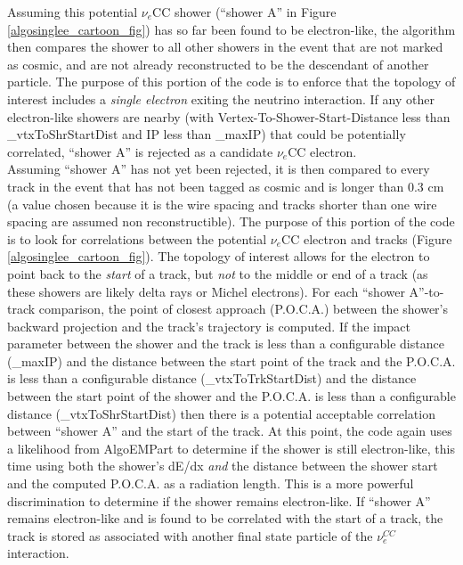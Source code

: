 Assuming this potential $\nu_e$CC shower (``shower A'' in Figure \ref{algosinglee_cartoon_fig}) has so far been found to be electron-like, the algorithm then compares the shower to all other showers in the event that are not marked as cosmic, and are not already reconstructed to be the descendant of another particle. The purpose of this portion of the code is to enforce that the topology of interest includes a \textit{single electron} exiting the neutrino interaction. If any other electron-like showers are nearby (with Vertex-To-Shower-Start-Distance less than \_vtxToShrStartDist and IP less than \_maxIP) that could be potentially correlated, ``shower A'' is rejected as a candidate $\nu_e$CC electron.\\

Assuming ``shower A'' has not yet been rejected, it is then compared to every track in the event that has not been tagged as cosmic and is longer than 0.3 cm (a value chosen because it is the wire spacing and tracks shorter than one wire spacing are assumed non reconstructible). The purpose of this portion of the code is to look for correlations between the potential $\nu_e$CC electron and tracks (Figure \ref{algosinglee_cartoon_fig}). The topology of interest allows for the electron to point back to the \textit{start} of a track, but \textit{not} to the middle or end of a track (as these showers are likely delta rays or Michel electrons). For each ``shower A''-to-track comparison, the point of closest approach (P.O.C.A.) between the shower's backward projection and the track's trajectory is computed. If the impact parameter between the shower and the track is less than a configurable distance (\_maxIP) and the distance between the start point of the track and the P.O.C.A. is less than a configurable distance (\_vtxToTrkStartDist) and the distance between the start point of the shower and the P.O.C.A. is less than a configurable distance (\_vtxToShrStartDist) then there is a potential acceptable correlation between ``shower A'' and the start of the track. At this point, the code again uses a likelihood from AlgoEMPart to determine if the shower is still electron-like, this time using both the shower's dE/dx \textit{and} the distance between the shower start and the computed P.O.C.A. as a radiation length. This is a more powerful discrimination to determine if the shower remains electron-like. If ``shower A'' remains electron-like and is found to be correlated with the start of a track, the track is stored as associated with another final state particle of the $\nu_e^{CC}$ interaction.\\

